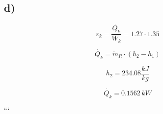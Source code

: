 

\subsection*{d)}

\[ \varepsilon_k = \frac{\dot{Q_k}}{W_k} = 1.27 \cdot 1.35 \]

\[
\dot{Q_k} = \dot{m}_R \cdot (h_2 - h_1)
\]

\[ h_2 = 234.08 \frac{kJ}{kg} \]

\[ \dot{Q_k} = 0.1562 \, kW \]

```